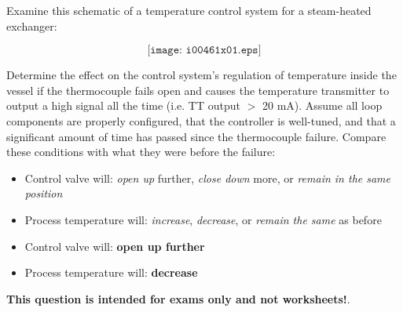 

Examine this schematic of a temperature control system for a steam-heated exchanger:

$$\texttt{[image: i00461x01.eps]}$$

Determine the effect on the control system's regulation of temperature inside the vessel if the thermocouple fails open and causes the temperature transmitter to output a high signal all the time (i.e. TT output $>$ 20 mA).  Assume all loop components are properly configured, that the controller is well-tuned, and that a significant amount of time has passed since the thermocouple failure.  Compare these conditions with what they were before the failure:

\begin{itemize}
\item{} Control valve will: {\it open up} further, {\it close down} more, or {\it remain in the same position} 
\vskip 10pt
\item{} Process temperature will: {\it increase}, {\it decrease}, or {\it remain the same} as before
\end{itemize}







\begin{itemize}
\item{} Control valve will: {\bf open up further}
\vskip 10pt
\item{} Process temperature will: {\bf decrease}
\end{itemize}







{\bf This question is intended for exams only and not worksheets!}.


